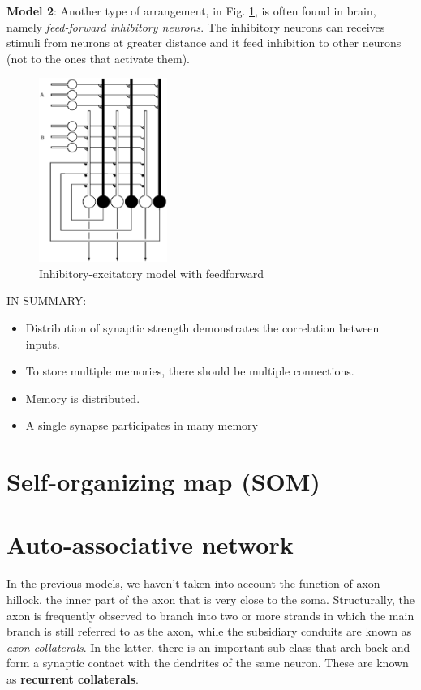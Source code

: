 {\bf Model 2}: Another type of arrangement, in
Fig. \ref{fig:auto_assoc2}, is often found in brain, namely
{\it feed-forward inhibitory neurons}. The inhibitory neurons can
receives stimuli from neurons at greater distance and it feed
inhibition to other neurons (not to the ones that activate them).

\begin{figure}[htb]
  \centerline{\includegraphics[height=6cm]{./images/inhibitory_excitatory_feedforward.eps}}
  \caption{Inhibitory-excitatory model with feedforward}\label{fig:auto_assoc2}
\end{figure}


IN SUMMARY:
\begin{itemize}
\item Distribution of synaptic strength demonstrates the correlation
  between inputs.
\item To store multiple memories, there should be multiple
  connections.
\item Memory is distributed.
\item A single synapse participates in many memory
\end{itemize}

\section{Self-organizing map (SOM)}
\label{sec:Self-organizing-map}


\section{Auto-associative network}

In the previous models, we haven't taken into account the function of
axon hillock, the inner part of the axon that is very close to the
soma. Structurally, the axon is frequently observed to branch into two
or more strands in which the main branch is still referred to as the
axon, while the subsidiary conduits are known as
{\it axon collaterals}. In the latter, there is an important sub-class
that arch back and form a synaptic contact with the dendrites  of the
same neuron. These are known as {\bf recurrent collaterals}.

